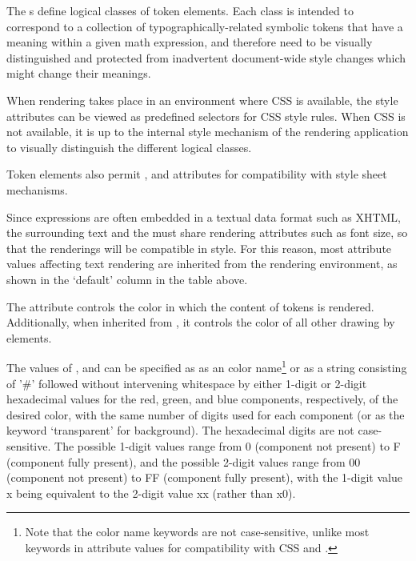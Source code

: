 The {s} define logical classes of
token elements. Each class is intended to correspond to a collection of
typographically-related symbolic tokens that have a meaning within a given math
expression, and therefore need to be visually distinguished and protected from
inadvertent document-wide style changes which might change their meanings.

When {\codeml} rendering takes place in an environment where CSS is available, the
style attributes can be viewed as predefined selectors for CSS style rules. When
CSS is not available, it is up to the internal style mechanism of the rendering
application to visually distinguish the different logical classes.

Token elements also permit {}, {} and
{} attributes for compatibility with style sheet
mechanisms.

Since {\codeml} expressions are often embedded in a textual data format such as
XHTML, the surrounding text and the {\codeml} must share rendering attributes such
as font size, so that the renderings will be compatible in style. For this reason,
most attribute values affecting text rendering are inherited from the rendering
environment, as shown in the `default' column in the table above. 

The {} attribute controls the color in which the
content of tokens is rendered. Additionally, when inherited from
{}, it controls the color of all other drawing by {\codeml}
elements.

The values of {}, and
{} can be specified as as an {\html} color
name\footnote{Note that the color name keywords are not case-sensitive, unlike
  most keywords in {\codeml} attribute values for compatibility with CSS and
  {\html}.}  or as a string consisting of '\#' followed without intervening
whitespace by either 1-digit or 2-digit hexadecimal values for the red, green, and
blue components, respectively, of the desired color, with the same number of
digits used for each component (or as the keyword `transparent' for background).
The hexadecimal digits are not case-sensitive. The possible 1-digit values range
from 0 (component not present) to F (component fully present), and the possible
2-digit values range from 00 (component not present) to FF (component fully
present), with the 1-digit value x being equivalent to the 2-digit value xx
(rather than x0).

